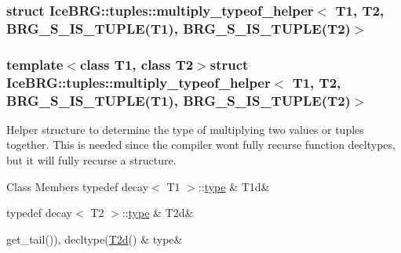 \subsubsection{struct Ice\+B\+R\+G\+:\+:tuples\+:\+:multiply\+\_\+typeof\+\_\+helper$<$ T1, T2, B\+R\+G\+\_\+\+S\+\_\+\+I\+S\+\_\+\+T\+U\+P\+L\+E(T1), B\+R\+G\+\_\+\+S\+\_\+\+I\+S\+\_\+\+T\+U\+P\+L\+E(T2)$>$}
\subsubsection*{template$<$class T1, class T2$>$struct Ice\+B\+R\+G\+::tuples\+::multiply\+\_\+typeof\+\_\+helper$<$ T1, T2, B\+R\+G\+\_\+\+S\+\_\+\+I\+S\+\_\+\+T\+U\+P\+L\+E(\+T1), B\+R\+G\+\_\+\+S\+\_\+\+I\+S\+\_\+\+T\+U\+P\+L\+E(\+T2)$>$}

Helper structure to determine the type of multiplying two values or tuples together. This is needed since the compiler won\textquotesingle{}t fully recurse function decltypes, but it will fully recurse a structure. \begin{DoxyFields}{Class Members}
\hypertarget{namespaceIceBRG_1_1tuples_aab307083c178318760b27db29f19cf65}{}typedef decay$<$ T1 $>$\+::\hyperlink{namespaceIceBRG_1_1tuples_a364d75e832c65a371dae7fd6ae0702f9}{type}\label{namespaceIceBRG_1_1tuples_aab307083c178318760b27db29f19cf65}
&
T1d&
\\
\hline

\hypertarget{namespaceIceBRG_1_1tuples_ae6c39ce39ba34e94adb6679a7304326e}{}typedef decay$<$ T2 $>$\+::\hyperlink{namespaceIceBRG_1_1tuples_a364d75e832c65a371dae7fd6ae0702f9}{type}\label{namespaceIceBRG_1_1tuples_ae6c39ce39ba34e94adb6679a7304326e}
&
T2d&
\\
\hline

\hypertarget{namespaceIceBRG_1_1tuples_a364d75e832c65a371dae7fd6ae0702f9}{}get\+\_\+tail()), decltype(\hyperlink{namespaceIceBRG_1_1tuples_ae6c39ce39ba34e94adb6679a7304326e}{T2d}()\label{namespaceIceBRG_1_1tuples_a364d75e832c65a371dae7fd6ae0702f9}
&
type&
\\
\hline

\end{DoxyFields}
\label{structIceBRG_1_1tuples_1_1multiply__typeof__helper_3_01T1_00_01T2_00_01BRG__S__IS__TUPLE_07T1_08d0dac86c84971415068079a4f4319b30}
\hypertarget{namespaceIceBRG_1_1tuples_structIceBRG_1_1tuples_1_1multiply__typeof__helper_3_01T1_00_01T2_00_01BRG__S__IS__TUPLE_07T1_08d0dac86c84971415068079a4f4319b30}{}
